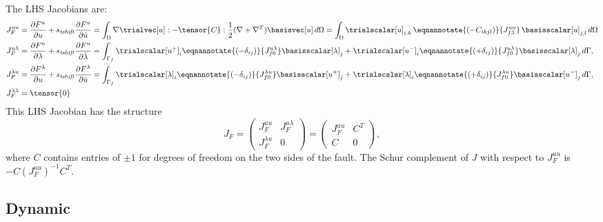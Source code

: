 The LHS Jacobians are:
\begin{align}
  J_F^{uu} &= \frac{\partial F^u}{\partial u} + s_\mathit{tshift} \frac{\partial F^u}{\partial \dot{u}}
      = \int_\Omega \nabla \trialvec[u] : -\tensor{C} : \frac{1}{2}(\nabla + \nabla^T)\basisvec[u] 
\, d\Omega 
      = \int_\Omega \trialscalar[u]_{i,k} \, \eqnannotate{\left( -C_{ikjl} \right)}{J_{f3}^{uu}} \, \basisscalar[u]_{j,l}\, d\Omega \\
  J_F^{u\lambda} &= \frac{\partial F^u}{\partial \lambda} + s_\mathit{tshift} \frac{\partial F^u}{\partial \dot{\lambda}}
      = \int_{\Gamma_{f}} \trialscalar[u^+]_i \eqnannotate{\left(-\delta_{ij}\right)}{J^{u\lambda}_{f0}} \basisscalar[\lambda]_j
                   + \trialscalar[u^-]_i \eqnannotate{\left(+\delta_{ij}\right)}{J^{u\lambda}_{f0}} \basisscalar[\lambda]_j\, d\Gamma, \\
  J_F^{\lambda u} &= \frac{\partial F^\lambda}{\partial u} + s_\mathit{tshift} \frac{\partial F^\lambda}{\partial \dot{u}}
      = \int_{\Gamma_{f}} \trialscalar[\lambda]_i 
                    \eqnannotate{\left(-\delta_{ij}\right)}{J^{\lambda u}_{f0}} \basisscalar[u^+]_j
                    + \trialscalar[\lambda]_i \eqnannotate{\left(+\delta_{ij}\right)}{J^{\lambda u}_{f0}} \basisscalar[u^-]_j \, d\Gamma, \\
  J_F^{\lambda \lambda} &= \tensor{0}
\end{align}
This LHS Jacobian has the structure
\begin{equation}
  J_F = \left( \begin{array} {cc} J_F^{uu} & J_F^{u\lambda} \\ J_F^{\lambda u} & 0 \end{array} \right)
      = \left( \begin{array} {cc} J_F^{uu} & C^T \\ C & 0 \end{array} \right),
\end{equation}
where $C$ contains entries of $\pm 1$ for degrees of
freedom on the two sides of the fault. The Schur complement of $J$
with respect to $J_F^{uu}$ is $-C\left(J_F^{uu}\right)^{-1}C^T$.


\subsection{Dynamic}


